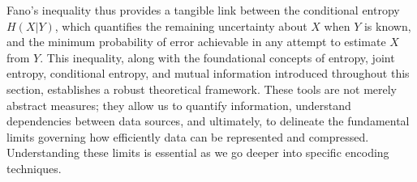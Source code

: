 Fano's inequality thus provides a tangible link between the conditional entropy $H(X|Y)$, which quantifies the remaining uncertainty about $X$ when $Y$ is known, and the minimum probability of error achievable in any attempt to estimate $X$ from $Y$. This inequality, along with the foundational concepts of entropy, joint entropy, conditional entropy, and mutual information introduced throughout this section, establishes a robust theoretical framework. These tools are not merely abstract measures; they allow us to quantify information, understand dependencies between data sources, and ultimately, to delineate the fundamental limits governing how efficiently data can be represented and compressed. Understanding these limits is essential as we go deeper into specific encoding techniques.
